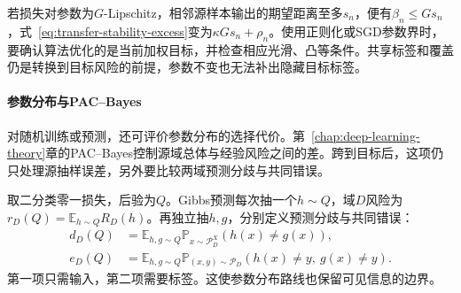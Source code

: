 若损失对参数为$G$-Lipschitz，相邻源样本输出的期望距离至多$s_n$，便有$\beta_n\leq Gs_n$，式~\eqref{eq:transfer-stability-excess}变为$\kappa Gs_n+\rho_n$。使用正则化或SGD参数界时，要确认算法优化的是当前加权目标，并检查相应光滑、凸等条件。共享标签和覆盖仍是转换到目标风险的前提，参数不变也无法补出隐藏目标标签。

\paragraph{参数分布与PAC--Bayes}
\label{sec:transfer-pac-bayes}

对随机训练或预测，还可评价参数分布的选择代价。第~\ref{chap:deep-learning-theory}章的PAC--Bayes控制源域总体与经验风险之间的差。跨到目标后，这项仍只处理源抽样误差，另外要比较两域预测分歧与共同错误。

取二分类零一损失，后验为$Q$。Gibbs预测每次抽一个$h\sim Q$，域$D$风险为$r_D(Q)=\mathbb E_{h\sim Q}R_D(h)$。再独立抽$h,g$，分别定义预测分歧与共同错误：
\begin{align*}
 d_D(Q)&=\mathbb E_{h,g\sim Q}\mathbb P_{x\sim\mathcal P_D^X}(h(x)\neq g(x)),\\
 e_D(Q)&=\mathbb E_{h,g\sim Q}\mathbb P_{(x,y)\sim\mathcal P_D}
                       (h(x)\neq y,\ g(x)\neq y).
\end{align*}
第一项只需输入，第二项需要标签。这使参数分布路线也保留可见信息的边界。

